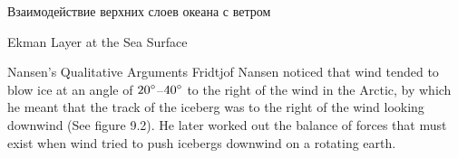 \begin{chapter}{Взаимодействие верхних слоев океана с ветром}
\begin{section}{Ekman Layer at the Sea Surface}

\begin{paragraph}{Nansen's Qualitative Arguments}
Fridtjof Nansen noticed that wind tended to blow ice at an angle of
${20}^\circ$--${40}^\circ$ to the right of the wind in the Arctic, by
which he meant that the track of the iceberg was to the right of the
wind looking downwind (See figure 9.2). He later worked out the
balance of forces that must exist when wind tried to push icebergs
downwind on a rotating earth.
%


\end{paragraph}
\end{section}
\end{chapter}
